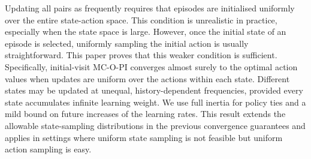 

Updating all pairs as frequently requires that episodes are initialised uniformly over the entire state-action space.
This condition is unrealistic in practice, especially when the state space is large.
However, once the initial state of an episode is selected, uniformly sampling the initial action is usually straightforward.
This paper proves that this weaker condition is sufficient.
Specifically, initial-visit MC-O-PI converges almost surely to the optimal action values when updates are uniform over the actions within each state.
Different states may be updated at unequal, history-dependent frequencies, provided every state accumulates infinite learning weight. We use full inertia for policy ties and a mild bound on future increases of the learning rates.
This result extends the allowable state-sampling distributions in the previous convergence guarantees
and applies in settings where uniform state sampling is not feasible but uniform action sampling is easy.


